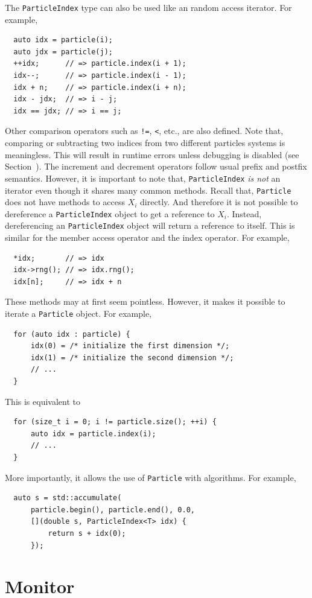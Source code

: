 The \verb|ParticleIndex| type can also be used like an random access iterator.
For example,
\begin{Verbatim}
  auto idx = particle(i);
  auto jdx = particle(j);
  ++idx;      // => particle.index(i + 1);
  idx--;      // => particle.index(i - 1);
  idx + n;    // => particle.index(i + n);
  idx - jdx;  // => i - j;
  idx == jdx; // => i == j;
\end{Verbatim}
Other comparison operators such as \verb|!=|, \verb|<|, etc., are also
defined. Note that, comparing or subtracting two indices from two different
particles systems is meaningless. This will result in runtime errors unless
debugging is disabled (see Section~). The increment
and decrement operators follow usual prefix and postfix semantics. However, it
is important to note that, \verb|ParticleIndex| \emph{is not} an iterator even
though it shares many common methods. Recall that, \verb|Particle| does not
have methods to access $X_i$ directly. And therefore it is not possible to
dereference a \verb|ParticleIndex| object to get a reference to $X_i$. Instead,
dereferencing an \verb|ParticleIndex| object will return a reference to itself.
This is similar for the member access operator and the index operator. For
example,
\begin{Verbatim}
  *idx;       // => idx
  idx->rng(); // => idx.rng();
  idx[n];     // => idx + n
\end{Verbatim}
These methods may at first seem pointless. However, it makes it possible to
iterate a \verb|Particle| object. For example,
\begin{Verbatim}
  for (auto idx : particle) {
      idx(0) = /* initialize the first dimension */;
      idx(1) = /* initialize the second dimension */;
      // ...
  }
\end{Verbatim}
This is equivalent to
\begin{Verbatim}
  for (size_t i = 0; i != particle.size(); ++i) {
      auto idx = particle.index(i);
      // ...
  }
\end{Verbatim}
More importantly, it allows the use of \verb|Particle| with algorithms. For
example,
\begin{Verbatim}
  auto s = std::accumulate(
      particle.begin(), particle.end(), 0.0,
      [](double s, ParticleIndex<T> idx) {
          return s + idx(0);
      });
\end{Verbatim}

\section{Monitor}
\label{sec:Monitor}

